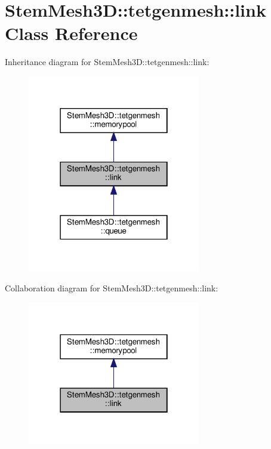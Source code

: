 \hypertarget{classStemMesh3D_1_1tetgenmesh_1_1link}{}\section{Stem\+Mesh3D\+:\+:tetgenmesh\+:\+:link Class Reference}
\label{classStemMesh3D_1_1tetgenmesh_1_1link}


Inheritance diagram for Stem\+Mesh3D\+:\+:tetgenmesh\+:\+:link\+:\nopagebreak
\begin{figure}[H]
\begin{center}
\leavevmode
\includegraphics[width=214pt]{classStemMesh3D_1_1tetgenmesh_1_1link__inherit__graph}
\end{center}
\end{figure}


Collaboration diagram for Stem\+Mesh3D\+:\+:tetgenmesh\+:\+:link\+:\nopagebreak
\begin{figure}[H]
\begin{center}
\leavevmode
\includegraphics[width=214pt]{classStemMesh3D_1_1tetgenmesh_1_1link__coll__graph}
\end{center}
\end{figure}
